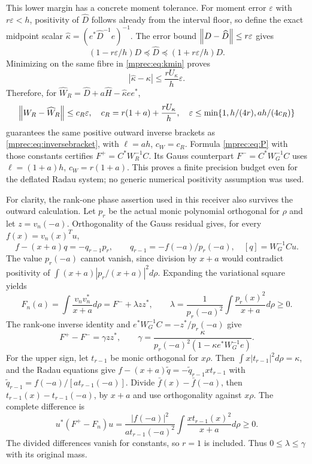 This lower margin has a concrete moment tolerance. For moment
error $\varepsilon$ with $r\varepsilon<h$, positivity of
$\widehat D$ follows already from the interval floor, so define
the exact midpoint scalar $\widehat\kappa=(e^*\widehat D^{-1}e)^{-1}$.
The error bound $\left\lVert D-\widehat D\right\rVert\le r\varepsilon$ gives
\[
 (1-r\varepsilon/h)D\preceq\widehat D
 \preceq(1+r\varepsilon/h)D.
\]
Minimizing on the same fibre in \eqref{mprec:eq:kmin} proves
\begin{equation}\label{mprec:eq:kerror}
 |\widehat\kappa-\kappa|\le
                  \frac{rU_\kappa}{h}\varepsilon.
\end{equation}
Therefore, for
$\widehat W_R=\widehat D+a\widehat H-\widehat\kappa ee^*$,
\begin{equation}\label{mprec:eq:radauprecision}
 \left\lVert W_R-\widehat W_R\right\rVert\le c_R\varepsilon,
 \quad c_R=r(1+a)+\frac{rU_\kappa}{h},\quad
 \varepsilon\le\min\{1,h/(4r),ah/(4c_R)\}
\end{equation}
guarantees the same positive outward inverse brackets as
\eqref{mprec:eq:inversebracket}, with $\ell=ah$, $c_W=c_R$.
Formula \eqref{mprec:eq:P} with those constants certifies
$F^+=C^*W_R^{-1}C$. Its Gauss counterpart
$F^-=C^*W_G^{-1}C$ uses $\ell=(1+a)h$, $c_W=r(1+a)$.
This proves a finite precision budget even for the deflated Radau
system; no generic numerical positivity assumption was used.

For clarity, the rank-one phase assertion used in this receiver
also survives the outward calculation. Let $p_r$ be the actual
monic polynomial orthogonal for $\rho$ and let $z=v_n(-a)$.
Orthogonality of the Gauss residual gives, for every
$f(x)=v_n(x)^Tu$,
\[
 f-(x+a)q=-q_{r-1}p_r,\qquad q_{r-1}=-f(-a)/p_r(-a),
 \quad[q]=W_G^{-1}Cu.
\]
The value $p_r(-a)$ cannot vanish, since division by $x+a$
would contradict positivity of $\int(x+a)|p_r/(x+a)|^2d\rho$.
Expanding the variational square yields
\begin{equation}\label{mprec:eq:phase}
 F_n(a)=\int\frac{v_nv_n^*}{x+a}d\rho
       =F^-+\lambda zz^*,\qquad
 \lambda=\frac1{p_r(-a)^2}\int\frac{p_r(x)^2}{x+a}d\rho\ge0.
\end{equation}
The rank-one inverse identity and
$e^*W_G^{-1}C=-z^*/p_r(-a)$ give
\[
 F^+-F^-=\gamma zz^*,\qquad
 \gamma=\frac{\kappa}{p_r(-a)^2(1-\kappa e^*W_G^{-1}e)}.
\]
For the upper sign, let $t_{r-1}$ be monic orthogonal for $x\rho$.
Then $\int x|t_{r-1}|^2d\rho=\kappa$, and the Radau equations
give $f-(x+a)\widetilde q=-\widetilde q_{r-1}xt_{r-1}$ with
$\widetilde q_{r-1}=f(-a)/[a t_{r-1}(-a)]$.
Divide $\bar f(x)-\bar f(-a)$, then
$t_{r-1}(x)-t_{r-1}(-a)$, by $x+a$ and use orthogonality
against $x\rho$. The complete difference is
\[
 u^*(F^+-F_n)u=
 \frac{|f(-a)|^2}{a t_{r-1}(-a)^2}
                   \int\frac{x t_{r-1}(x)^2}{x+a}d\rho\ge0.
\]
The divided differences vanish for constants, so $r=1$ is included.
Thus $0\le\lambda\le\gamma$ with its original mass.

